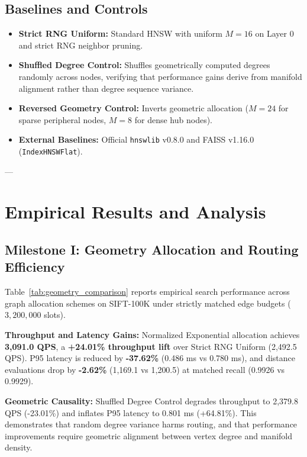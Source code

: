 \documentclass[10pt,journal,compsoc]{IEEEtran}
\begin{document}
\subsection{Baselines and Controls}
\begin{itemize}
    \item \textbf{Strict RNG Uniform:} Standard HNSW with uniform $M=16$ on Layer 0 and strict RNG neighbor pruning.
    \item \textbf{Shuffled Degree Control:} Shuffles geometrically computed degrees randomly across nodes, verifying that performance gains derive from manifold alignment rather than degree sequence variance.
    \item \textbf{Reversed Geometry Control:} Inverts geometric allocation ($M=24$ for sparse peripheral nodes, $M=8$ for dense hub nodes).
    \item \textbf{External Baselines:} Official \texttt{hnswlib} v0.8.0 and FAISS v1.16.0 (\texttt{IndexHNSWFlat}).
\end{itemize}

---

\section{Empirical Results and Analysis}
\label{sec:results}



\subsection{Milestone I: Geometry Allocation and Routing Efficiency}
Table~\ref{tab:geometry_comparison} reports empirical search performance across graph allocation schemes on SIFT-100K under strictly matched edge budgets ($3{,}200{,}000$ slots).

\textbf{Throughput and Latency Gains:} Normalized Exponential allocation achieves \textbf{3,091.0 QPS}, a \textbf{+24.01\% throughput lift} over Strict RNG Uniform (2,492.5 QPS). P95 latency is reduced by \textbf{-37.62\%} (0.486 ms vs 0.780 ms), and distance evaluations drop by \textbf{-2.62\%} (1,169.1 vs 1,200.5) at matched recall (0.9926 vs 0.9929).

\textbf{Geometric Causality:} Shuffled Degree Control degrades throughput to 2,379.8 QPS (-23.01\%) and inflates P95 latency to 0.801 ms (+64.81\%). This demonstrates that random degree variance harms routing, and that performance improvements require geometric alignment between vertex degree and manifold density.
\end{document}
